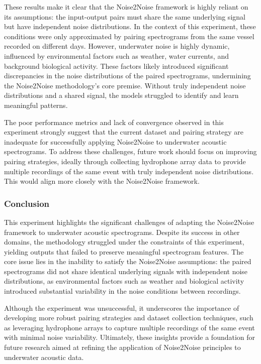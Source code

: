 These results make it clear that the Noise2Noise framework is highly reliant on its assumptions: the input-output pairs must share the same underlying signal but have independent noise distributions. In the context of this experiment, these conditions were only approximated by pairing spectrograms from the same vessel recorded on different days. However, underwater noise is highly dynamic, influenced by environmental factors such as weather, water currents, and background biological activity. These factors likely introduced significant discrepancies in the noise distributions of the paired spectrograms, undermining the Noise2Noise methodology's core premise. Without truly independent noise distributions and a shared signal, the models struggled to identify and learn meaningful patterns.

The poor performance metrics and lack of convergence observed in this experiment strongly suggest that the current dataset and pairing strategy are inadequate for successfully applying Noise2Noise to underwater acoustic spectrograms. To address these challenges, future work should focus on improving pairing strategies, ideally through collecting hydrophone array data to provide multiple recordings of the same event with truly independent noise distributions. This would align more closely with the Noise2Noise framework.

\subsubsection{Conclusion}

This experiment highlights the significant challenges of adapting the Noise2Noise framework to underwater acoustic spectrograms. Despite its success in other domains, the methodology struggled under the constraints of this experiment, yielding outputs that failed to preserve meaningful spectrogram features. The core issue lies in the inability to satisfy the Noise2Noise assumptions: the paired spectrograms did not share identical underlying signals with independent noise distributions, as environmental factors such as weather and biological activity introduced substantial variability in the noise conditions between recordings.

Although the experiment was unsuccessful, it underscores the importance of developing more robust pairing strategies and dataset collection techniques, such as leveraging hydrophone arrays to capture multiple recordings of the same event with minimal noise variability. Ultimately, these insights provide a foundation for future research aimed at refining the application of Noise2Noise principles to underwater acoustic data.

